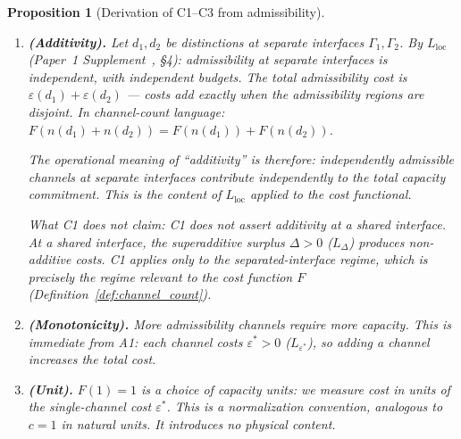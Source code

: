 \documentclass[11pt]{article}
\newtheorem{proposition}[theorem]{Proposition}
\theoremstyle{definition}
\begin{document}
\begin{proposition}[Derivation of C1--C3 from admissibility]\label{prop:C1C3}
\leavevmode
\begin{enumerate}[label=\textbf{C\arabic*},nosep,leftmargin=3em]
  \item \textbf{(Additivity).}  Let $d_1, d_2$ be distinctions at
  \emph{separate} interfaces $\Gamma_1, \Gamma_2$.  By $L_{\mathrm{loc}}$
  (Paper~1 Supplement~\cite{BrookeSupplement}, \S4): admissibility at separate
  interfaces is independent, with independent budgets.  The total
  admissibility cost is $\varepsilon(d_1) + \varepsilon(d_2)$ --- costs
  add exactly when the admissibility regions are disjoint.  In channel-count
  language: $F(n(d_1) + n(d_2)) = F(n(d_1)) + F(n(d_2))$.

  The operational meaning of ``additivity'' is therefore:
  \emph{independently admissible channels at separate interfaces
  contribute independently to the total capacity commitment.}  This is
  the content of $L_{\mathrm{loc}}$ applied to the cost functional.

  \textit{What C1 does not claim:} C1 does not assert additivity at a
  \emph{shared} interface.  At a shared interface, the superadditive
  surplus $\Delta > 0$ ($L_\Delta$) produces non-additive costs.
  C1 applies only to the separated-interface regime, which is precisely
  the regime relevant to the cost function $F$ (Definition~\ref{def:channel_count}).

  \item \textbf{(Monotonicity).}  More admissibility channels require
  more capacity.  This is immediate from A1: each channel costs
  $\varepsilon^* > 0$ ($L_{\varepsilon^*}$), so adding a channel
  increases the total cost.

  \item \textbf{(Unit).}  $F(1) = 1$ is a choice of capacity units:
  we measure cost in units of the single-channel cost $\varepsilon^*$.
  This is a normalization convention, analogous to $c = 1$ in natural
  units.  It introduces no physical content.
\end{enumerate}
\end{proposition}
\end{document}

